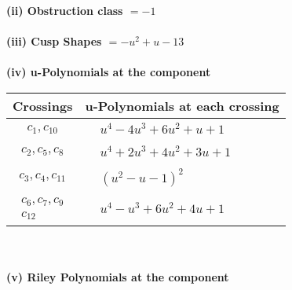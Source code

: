\documentclass[1p]{elsarticle_modified}
\theoremstyle{definition}
\begin{document}
\flushleft \textbf{(ii) Obstruction class $= -1$}\\~\\
\flushleft \textbf{(iii) Cusp Shapes $= - u^2+u-13$}\\~\\
\newpage\renewcommand{\arraystretch}{1}
\flushleft \textbf{(iv) u-Polynomials at the component}\newline \\
\begin{tabular}{m{50pt}|m{274pt}}
Crossings & \hspace{64pt}u-Polynomials at each crossing \\
\hline $$\begin{aligned}c_{1},c_{10}\end{aligned}$$&$\begin{aligned}
&u^4-4 u^3+6 u^2+u+1
\end{aligned}$\\
\hline $$\begin{aligned}c_{2},c_{5},c_{8}\end{aligned}$$&$\begin{aligned}
&u^4+2 u^3+4 u^2+3 u+1
\end{aligned}$\\
\hline $$\begin{aligned}c_{3},c_{4},c_{11}\end{aligned}$$&$\begin{aligned}
&(u^2- u-1)^2
\end{aligned}$\\
\hline $$\begin{aligned}c_{6},c_{7},c_{9}\\c_{12}\end{aligned}$$&$\begin{aligned}
&u^4- u^3+6 u^2+4 u+1
\end{aligned}$\\
\hline
\end{tabular}\\~\\
\newpage\renewcommand{\arraystretch}{1}
\flushleft \textbf{(v) Riley Polynomials at the component}\newline \\
\end{document}
